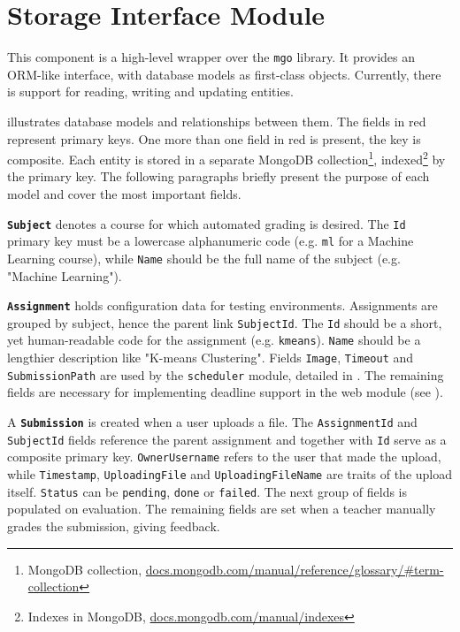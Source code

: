 \section{Storage Interface Module}
\label{sec:storage-module}

This component is a high-level wrapper over the \texttt{mgo} library. It provides an ORM-like interface, with database models as first-class objects. Currently, there is support for reading, writing and updating entities.


 illustrates database models and relationships between them. The fields in red represent primary keys. One more than one field in red is present, the key is composite. Each entity is stored in a separate MongoDB collection\footnote{MongoDB collection, \url{docs.mongodb.com/manual/reference/glossary/\#term-collection}}, indexed\footnote{Indexes in MongoDB, \url{docs.mongodb.com/manual/indexes}} by the primary key. The following paragraphs briefly present the purpose of each model and cover the most important fields.

\textbf{\texttt{Subject}} denotes a course for which automated grading is desired. The \texttt{Id} primary key must be a lowercase alphanumeric code (e.g. \texttt{ml} for a Machine Learning course), while \texttt{Name} should be the full name of the subject (e.g. "Machine Learning").

\textbf{\texttt{Assignment}} holds configuration data for testing environments. Assignments are grouped by subject, hence the parent link \texttt{SubjectId}. The \texttt{Id} should be a short, yet human-readable code for the assignment (e.g. \texttt{kmeans}). \texttt{Name} should be a lengthier description like "K-means Clustering". Fields \texttt{Image}, \texttt{Timeout} and \texttt{SubmissionPath} are used by the \texttt{scheduler} module, detailed in . The remaining fields are necessary for implementing deadline support in the web module (see ).

A \textbf{\texttt{Submission}} is created when a user uploads a file. The \texttt{AssignmentId} and \texttt{SubjectId} fields reference the parent assignment and together with \texttt{Id} serve as a composite primary key. \texttt{OwnerUsername} refers to the user that made the upload, while \texttt{Timestamp}, \texttt{UploadingFile} and \texttt{UploadingFileName} are traits of the upload itself. \texttt{Status} can be \texttt{pending}, \texttt{done} or \texttt{failed}. The next group of fields is populated on evaluation. The remaining fields are set when a teacher manually grades the submission, giving feedback.

